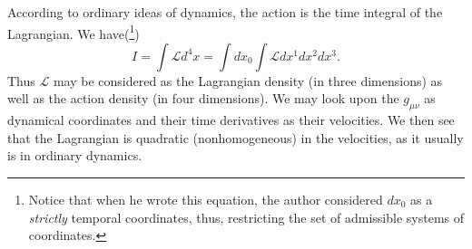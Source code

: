 According to ordinary ideas of dynamics, the action is the time integral of the Lagrangian. We have(\footnote{Notice 
that when he wrote this equation, the author considered $d x_0$ as a \emph{strictly} temporal coordinates, thus, 
restricting the set of admissible systems of coordinates.})
\[
 I = \int{\mathcal{L} d^4 x} = \int{ d x_0 \int{\mathcal{L} dx^1 dx^2 dx^3}}.
\]
Thus $\mathcal{L}$ may be considered as the Lagrangian density (in three dimensions) as well as the action density (in 
four dimensions). We may look upon the $g_{\mu\nu}$ as dynamical coordinates and their time derivatives as their 
velocities. We then see that the Lagrangian is quadratic (nonhomogeneous) in the velocities, as it usually is in 
ordinary dynamics.




